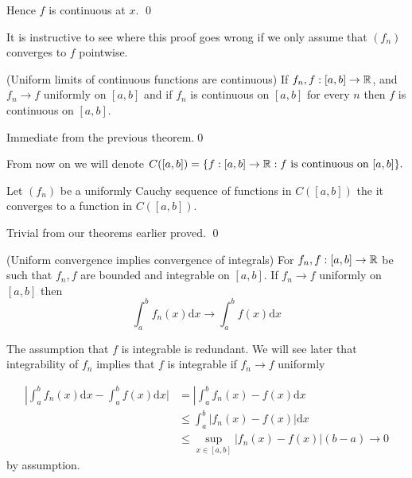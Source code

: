 \documentclass{article}
\begin{document}
Hence $ f $ is continuous at $ x $. \qed\par
It is instructive to see where this proof goes wrong if we only assume that $ (f_n) $ converges to $ f $ pointwise.
\begin{corollary}
	(Uniform limits of continuous functions are continuous) If $ f_n,f:[a,b]\to \mathbb{R} $, and $ f_n\to f $ uniformly on $ [a,b] $ and if $ f_n $ is continuous on $ [a,b] $ for every $ n $ then $ f $ is continuous on $ [a,b] $.
\end{corollary}
\pf Immediate from the previous theorem.\qed\par
From now on we will denote $ C([a,b]) = \{f:[a,b]\to \mathbb{R}:f\text{ is continuous on } [a,b]\}. $
\begin{theorem}
	Let $ (f_n) $ be a uniformly Cauchy sequence of functions in $ C([a,b]) $ the it converges to a function in $ C([a,b]) $.
\end{theorem}
\pf Trivial from our theorems earlier proved. \qed
\begin{theorem}
	(Uniform convergence implies convergence of integrals) For $ f_n,f:[a,b]\to \mathbb{R} $ be such that $ f_n,f $ are bounded and integrable on $ [a,b] $. If $ f_n\to f $ uniformly on $ [a,b] $ then
	\[
	  \int_a^bf_n(x)\mathrm dx\to \int_a^bf(x)\mathrm dx
	\]
\end{theorem}
\begin{remark}
  The assumption that $ f $ is integrable is redundant. We will see later that integrability of $ f_n $ implies that $ f $ is integrable if $ f_n\to f $ uniformly
\end{remark}
\pf
\begin{align*}
	\left|\int_a^bf_n(x)\mathrm dx-\int_a^bf(x)\mathrm dx|&=\left|\int_a^bf_n(x)-f(x)\mathrm dx \\
							      &\le \int_a^b |f_n(x)-f(x)|\mathrm dx \\
							      &\le \sup_{x\in [a,b]}|f_n(x)-f(x)|(b-a) \to 0
\end{align*}
by assumption.
\end{document}
